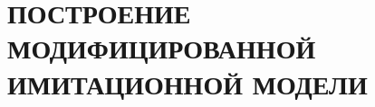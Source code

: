 \section[Построение модифицированной имитационной модели]{
  ПОСТРОЕНИЕ МОДИФИЦИРОВАННОЙ \\
  ИМИТАЦИОННОЙ МОДЕЛИ}
\label{sec:modified_model}

